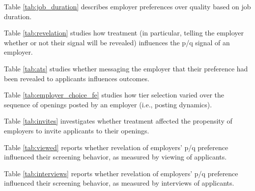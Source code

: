 \documentclass[prodmode,acmec]{ec-acmsmall}
\begin{document}
Table \ref{tab:job_duration} describes employer preferences over quality based on job duration.

Table \ref{tab:revelation} studies how treatment (in particular, telling the employer whether or not their signal will be revealed) influences the p/q signal of an employer.

Table \ref{tab:ats} studies whether messaging the employer that their preference had been revealed to applicants influences outcomes.

Table \ref{tab:employer_choice_fe} studies how tier selection varied over the sequence of openings posted by an employer (i.e., posting dynamics).

Table \ref{tab:invites} investigates whether treatment affected the propensity of employers to invite applicants to their openings.

Table \ref{tab:viewed} reports whether revelation of employers' p/q preference influenced their screening behavior, as measured by viewing of applicants.

Table \ref{tab:interviews} reports whether revelation of employers' p/q preference influenced their screening behavior, as measured by interviews of applicants.



\newpage
 

\newpage


\newpage


\newpage


\newpage


\newpage


\newpage


\newpage
 

\newpage


\newpage
 

\newpage
 

\newpage


\newpage
{\tiny
 
}

\newpage


\newpage
 
\end{document}
